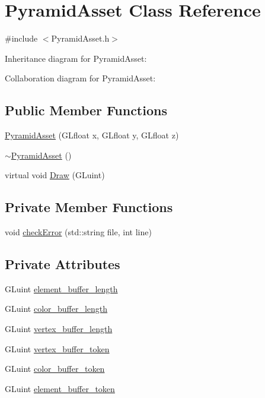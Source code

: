 \hypertarget{classPyramidAsset}{}\section{Pyramid\+Asset Class Reference}
\label{classPyramidAsset}


{\ttfamily \#include $<$Pyramid\+Asset.\+h$>$}



Inheritance diagram for Pyramid\+Asset\+:


Collaboration diagram for Pyramid\+Asset\+:
\subsection*{Public Member Functions}
\begin{DoxyCompactItemize}
\item 
\hyperlink{classPyramidAsset_a3f7c6fd658ed0d3e276d7fe6c1de95d1}{Pyramid\+Asset} (G\+Lfloat x, G\+Lfloat y, G\+Lfloat z)
\item 
\hyperlink{classPyramidAsset_afb388a196f43a3808b2d4f6fdb89ee84}{$\sim$\+Pyramid\+Asset} ()
\item 
virtual void \hyperlink{classPyramidAsset_aaea45da4956d79ec9ab96e9d0ccef3fe}{Draw} (G\+Luint)
\end{DoxyCompactItemize}
\subsection*{Private Member Functions}
\begin{DoxyCompactItemize}
\item 
void \hyperlink{classPyramidAsset_a34350044042e0098446dc9e0a260cb70}{check\+Error} (std\+::string file, int line)
\end{DoxyCompactItemize}
\subsection*{Private Attributes}
\begin{DoxyCompactItemize}
\item 
G\+Luint \hyperlink{classPyramidAsset_a5566105859271b493eab3b5f9c02f866}{element\+\_\+buffer\+\_\+length}
\item 
G\+Luint \hyperlink{classPyramidAsset_ae576f67cdec51a52645131919d86a38a}{color\+\_\+buffer\+\_\+length}
\item 
G\+Luint \hyperlink{classPyramidAsset_a9252f29d7dc33374d43dd779db4fcce4}{vertex\+\_\+buffer\+\_\+length}
\item 
G\+Luint \hyperlink{classPyramidAsset_a54d9cec42bc77d07a66e6c1cd55049b0}{vertex\+\_\+buffer\+\_\+token}
\item 
G\+Luint \hyperlink{classPyramidAsset_a7a984ee57fa7deda5aedf8b1f5f85c6f}{color\+\_\+buffer\+\_\+token}
\item 
G\+Luint \hyperlink{classPyramidAsset_a6f7e2f50904d2941e33df8eb7f5f9c2d}{element\+\_\+buffer\+\_\+token}
\end{DoxyCompactItemize}


